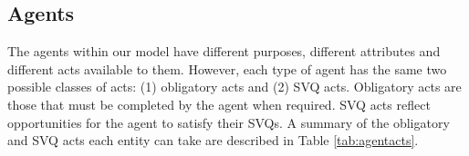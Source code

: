 \documentclass{scspaperproc}
\theoremstyle{scsthe}
\begin{document}

\subsection{Agents} 
The agents within our model have different purposes, different attributes and different acts available to them. However, each type of agent has the same two possible classes of acts: (1) obligatory acts and (2) SVQ acts.  Obligatory acts are those that must be completed by the agent when required. SVQ acts reflect opportunities for the agent to satisfy their SVQs. A summary of the obligatory and SVQ acts each entity can take are described in Table \ref{tab:agentacts}.
\end{document}
